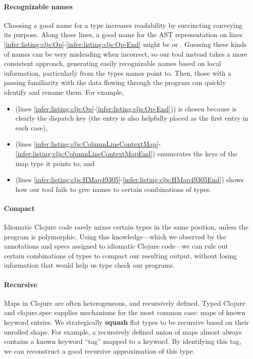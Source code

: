 \paragraph{Recognizable names}
Choosing a good name for a type increases
readability by succincting conveying its purpose.
Along those lines, a good name for the AST representation
on lines \ref{infer:listing:cljs:Op}-\ref{infer:listing:cljs:Op-End}
might be  or .
Guessing these kinds of names can be very misleading when incorrect, so
our tool instead takes a more consistent approach, generating easily recognizable
names based on local information, particularly from the types names point to.
Then, those with a passing familiarity with the data flowing through the program
can quickly identify and rename them.
For example,
\begin{itemize}
  \item
     (lines \ref{infer:listing:cljs:Op}-\ref{infer:listing:cljs:Op-End}))
    is chosen because  is
    clearly the dispatch key (the  entry is also helpfully placed
    as the first entry in each case),
  \item
     (lines \ref{infer:listing:cljs:ColumnLineContextMap}-\ref{infer:listing:cljs:ColumnLineContextMapEnd})
    enumerates the keys of the map type it points to, and
  \item
     (lines \ref{infer:listing:cljs:HMap49305}-\ref{infer:listing:cljs:HMap49305End})
    shows how our tool fails to give names to certain combinations
    of types.
\end{itemize}


\paragraph{Compact}
Idiomatic Clojure code rarely mixes certain types in the same position,
unless the program is polymorphic. Using this knowledge---which we observed
by the annotations and specs assigned to idiomatic Clojure 
code---we can rule out certain combinations of types to compact our
resulting output, without losing information that would help us
type check our programs.

\paragraph{Recursive}
Maps in Clojure are often heterogeneous, and recursively defined.
Typed Clojure and clojure.spec supplies mechanisms for the most
common case: maps of known keyword entries.
We strategically \textbf{squash} flat types to be recursive
based on their unrolled shape.
For example, a recursively defined union of maps almost always
contains a known keyword ``tag'' mapped to a keyword.
By identifying this tag, we can reconstruct a good recursive
approximation of this type.

